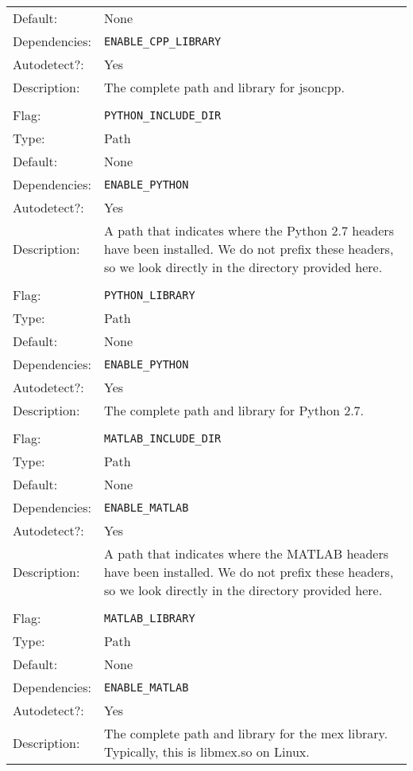 \documentclass{report}
\begin{document}
\begin{center}
\begin{longtable}{lp{}}
Default:      &None \\
Dependencies: &\texttt{ENABLE\_CPP\_LIBRARY}\\
Autodetect?:  &Yes \\
Description:  &The complete path and library for jsoncpp. \\
\\
Flag:         &\texttt{PYTHON\_INCLUDE\_DIR} \\
Type:         &Path \\
Default:      &None \\
Dependencies: &\texttt{ENABLE\_PYTHON} \\
Autodetect?:  &Yes \\
Description:  &A path that indicates where the Python 2.7 headers have been 
              installed.  We do not prefix these headers, so we look directly
              in the directory provided here.\\
\\
Flag:         &\texttt{PYTHON\_LIBRARY}\\
Type:         &Path \\
Default:      &None \\
Dependencies: &\texttt{ENABLE\_PYTHON}\\
Autodetect?:  &Yes \\
Description:  &The complete path and library for Python 2.7. \\
\\
Flag:         &\texttt{MATLAB\_INCLUDE\_DIR} \\
Type:         &Path \\
Default:      &None \\
Dependencies: &\texttt{ENABLE\_MATLAB}\\
Autodetect?:  &Yes \\
Description:  &A path that indicates where the MATLAB headers have been 
              installed.  We do not prefix these headers, so we look directly
              in the directory provided here.\\
\\
Flag:         &\texttt{MATLAB\_LIBRARY}\\
Type:         &Path \\
Default:      &None \\
Dependencies: &\texttt{ENABLE\_MATLAB}\\
Autodetect?:  &Yes \\
Description:  &The complete path and library for the mex library.  Typically,
              this is libmex.so on Linux.\\

\end{longtable}
\end{center}
\end{document}
